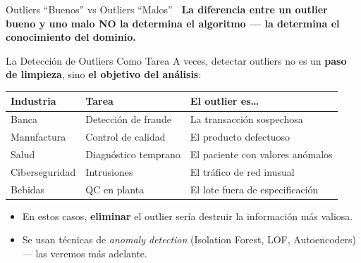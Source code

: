 \documentclass[aspectratio=169, 11pt]{beamer}
\begin{document}
\begin{frame}[shrink=10]{Outliers ``Buenos'' vs Outliers ``Malos''}
  \vspace{6pt}
  {\scriptsize\color{arcaDark}\bfseries
    \faExclamationTriangle\ La diferencia entre un outlier bueno y uno malo
    NO la determina el algoritmo --- la determina el \textbf{conocimiento del dominio}.}
\end{frame}

\begin{frame}[shrink=8]{La Detección de Outliers Como Tarea}
  \vspace{-4pt}
  {\footnotesize
    A veces, detectar outliers no es un \textbf{paso de limpieza}, sino \textbf{el objetivo del análisis}:}

  \vspace{6pt}
  {\small
  \renewcommand{\arraystretch}{1.3}
  \begin{tabular}{@{}p{3cm}p{4cm}p{5cm}@{}}
    \toprule
    \textbf{Industria} & \textbf{Tarea} & \textbf{El outlier es\ldots} \\
    \midrule
    Banca &
      Detección de fraude &
      La transacción sospechosa \\
    Manufactura &
      Control de calidad &
      El producto defectuoso \\
    Salud &
      Diagnóstico temprano &
      El paciente con valores anómalos \\
    Ciberseguridad &
      Intrusiones &
      El tráfico de red inusual \\
    Bebidas &
      QC en planta &
      El lote fuera de especificación \\
    \bottomrule
  \end{tabular}
  }

  \vspace{6pt}
  {\scriptsize\color{textMuted}
  \begin{itemize}\setlength{\itemsep}{3pt}
    \item[{\color{codePurple}\scriptsize\faArrowRight}]
      En estos casos, \textbf{eliminar} el outlier sería destruir la información más valiosa.
    \item[{\color{codePurple}\scriptsize\faArrowRight}]
      Se usan técnicas de \textit{anomaly detection} (Isolation Forest, LOF, Autoencoders)
      --- las veremos más adelante.
  \end{itemize}
  }
\end{frame}
\end{document}
